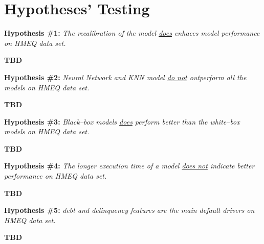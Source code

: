 \chapter{Hypotheses' Testing}
\label{chap:five}

\noindent \textbf{Hypothesis \#1:} \textit{The recalibration of the model \underline{does} enhaces model performance on HMEQ data set.}

\textbf{TBD}
\vspace{0.3cm}

\noindent \textbf{Hypothesis \#2:} \textit{Neural Network and KNN model \underline{do not} outperform all the models on HMEQ data set.}

\textbf{TBD}
\vspace{0.3cm}

\noindent \textbf{Hypothesis \#3:} \textit{Black--box models \underline{does} perform better than the white--box models on HMEQ data set.}

\textbf{TBD}
\vspace{0.3cm}

\noindent \textbf{Hypothesis \#4:} \textit{The longer execution time of a model \underline{does not} indicate better performance on HMEQ data set.}

\textbf{TBD}
\vspace{0.3cm}

\noindent \textbf{Hypothesis \#5:} \textit{ debt and delinquency features are the main default drivers on HMEQ data set.}

\textbf{TBD}